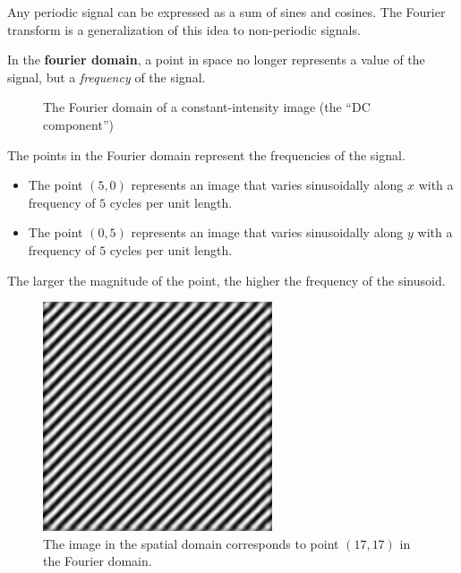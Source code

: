 Any periodic signal can be expressed as a sum of sines and cosines. The Fourier transform is a generalization of this idea to non-periodic signals.

In the \textbf{fourier domain}, a point in space no longer represents a value of the signal, but a \textit{frequency} of the signal.

\begin{figure}[ht!]
    \centering

    \caption{The Fourier domain of a constant-intensity image (the ``DC component'')}
\end{figure}

\begin{example}
    The points in the Fourier domain represent the frequencies of the signal.

    \begin{itemize}
        \item The point $(5, 0)$ represents an image that varies sinusoidally along $x$ with a frequency of $5$ cycles per unit length. 
        \item The point $(0, 5)$ represents an image that varies sinusoidally along $y$ with a frequency of $5$ cycles per unit length.
    \end{itemize}

    The larger the magnitude of the point, the higher the frequency of the sinusoid.

    \begin{figure}[ht!]
        \centering
        \includegraphics[width=0.25\linewidth]{figures/stp1fil1.png}

        \caption{The image in the spatial domain corresponds to point $(17, 17)$ in the Fourier domain.}
    \end{figure}
\end{example}

